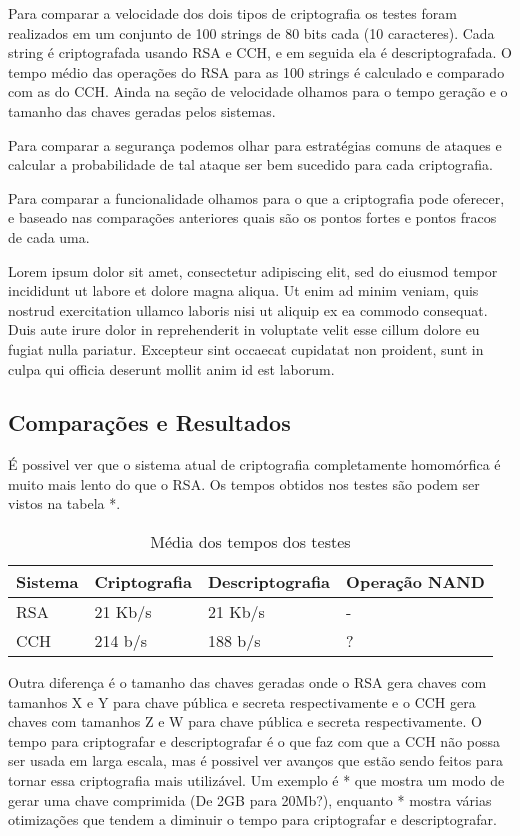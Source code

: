 	Para comparar a velocidade dos dois tipos de criptografia os testes foram realizados em um conjunto de 100 strings de 80 bits cada (10 caracteres). Cada string é criptografada usando RSA e CCH, e em seguida ela é descriptografada. O tempo médio das operações do RSA para as 100 strings é calculado e comparado com as do CCH. Ainda na seção de velocidade olhamos para o tempo geração e o tamanho das chaves geradas pelos sistemas.
	
	Para comparar a segurança podemos olhar para estratégias comuns de ataques e calcular a probabilidade de tal ataque ser bem sucedido para cada criptografia.
	
	Para comparar a funcionalidade olhamos para o que a criptografia pode oferecer, e baseado nas comparações anteriores quais são os pontos fortes e pontos fracos de cada uma.
	
	Lorem ipsum dolor sit amet, consectetur adipiscing elit, sed do eiusmod tempor incididunt ut labore et dolore magna aliqua. Ut enim ad minim veniam, quis nostrud exercitation ullamco laboris nisi ut aliquip ex ea commodo consequat. Duis aute irure dolor in reprehenderit in voluptate velit esse cillum dolore eu fugiat nulla pariatur. Excepteur sint occaecat cupidatat non proident, sunt in culpa qui officia deserunt mollit anim id est laborum.
	
	\subsection{Comparações e Resultados}
	É possivel ver que o sistema atual de criptografia completamente homomórfica é muito mais lento do que o RSA. Os tempos obtidos nos testes são podem ser vistos na tabela *.
	
\begin{table}[!h]
  \centering
  \begin{tabular}{ |l|l|l|l| }
    \hline
      Sistema & Criptografia & Descriptografia & Operação NAND \\
    \hline
      RSA & 21 Kb/s & 21 Kb/s & - \\
    \hline
      CCH & 214 b/s & 188 b/s & ? \\
    \hline
  \end{tabular}
  \caption{Média dos tempos dos testes}
  \label{tab:LABEL_TAB_RESULTADOS}
\end{table}

	Outra diferença é o tamanho das chaves geradas onde o RSA gera chaves com tamanhos X e Y para chave pública e secreta respectivamente e o CCH gera chaves com tamanhos Z e W para chave pública e secreta respectivamente. O tempo para criptografar e descriptografar é o que faz com que a CCH não possa ser usada em larga escala, mas é possivel ver avanços que estão sendo feitos para tornar essa criptografia mais utilizável. Um exemplo é * que mostra um modo de gerar uma chave comprimida (De 2GB para 20Mb?), enquanto * mostra várias otimizações que tendem a diminuir o tempo para criptografar e descriptografar.
	
